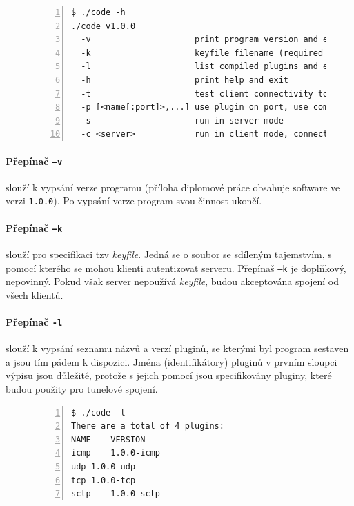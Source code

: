 \documentclass[thesis=M,czech]{FITthesis}[2012/10/20]
\begin{document}
    \begin{figure}[t]
	\begin{lstlisting}[label=code:opts,caption=Výpis podporovaných přepínačů aplikace,frame=single,numbers=left]
$ ./code -h
./code v1.0.0
  -v                     print program version and exit
  -k                     keyfile filename (required for auth)
  -l                     list compiled plugins and exit
  -h                     print help and exit
  -t                     test client connectivity to server and exit
  -p [<name[:port]>,...] use plugin on port, use comma to specify more plugins
  -s                     run in server mode
  -c <server>            run in client mode, connect to server ip/hostname
      \end{lstlisting}
    \end{figure}

    
    \paragraph{Přepínač \texttt{--v}} slouží k vypsání verze programu (příloha diplomové práce obsahuje software ve verzi \texttt{1.0.0}). Po vypsání verze program svou činnost ukončí.
    
    \paragraph{Přepínač \texttt{--k}} slouží pro specifikaci tzv \textit{keyfile}. Jedná se o soubor se sdíleným tajemstvím, s pomocí kterého se mohou klienti autentizovat serveru. Přepínaš \texttt{--k} je doplňkový, nepovinný. Pokud však server nepoužívá \textit{keyfile}, budou akceptována spojení od všech klientů.
    
    \paragraph{Přepínač \texttt{-l}} slouží k vypsání seznamu názvů a verzí pluginů, se kterými byl program sestaven a jsou tím pádem k dispozici. Jména (identifikátory) pluginů v prvním sloupci výpisu jsou důležité, protože s jejich pomocí jsou specifikovány pluginy, které budou použity pro tunelové spojení.

    \begin{figure}[h]
	\begin{lstlisting}[label=code:listplugins,caption=Výpis jmen a verzí podporovaných pluginů,frame=single,numbers=left]
$ ./code -l
There are a total of 4 plugins:
NAME	VERSION
icmp	1.0.0-icmp
udp	1.0.0-udp
tcp	1.0.0-tcp
sctp	1.0.0-sctp
      \end{lstlisting}
    \end{figure}
    
\end{document}
